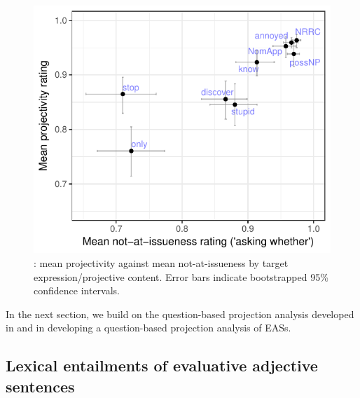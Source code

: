\documentclass[11pt,fleqn]{article}
\newcommand{\6}{\mbox{$[\hspace*{-.6mm}[$}}
\newcommand{\9}{\mbox{$]\hspace*{-.6mm}]$}}
\begin{document}
\begin{figure}[!h]

\begin{center}
\includegraphics[width=.55\textwidth]{figures/ai-proj-bytrigger-labels}
\end{center}

\caption{\citealt[509]{tbd-variability}: mean projectivity against mean not-at-issueness by target expression/projective content. Error bars indicate bootstrapped 95\% confidence intervals.}
\label{tbd}
\end{figure}

In the next section, we build on the question-based projection analysis developed in \citealt{best-question} and \citealt{tbd-variability} in developing a question-based projection analysis of EASs.

\subsection{Lexical entailments of evaluative adjective sentences}\label{s22}
\end{document}
